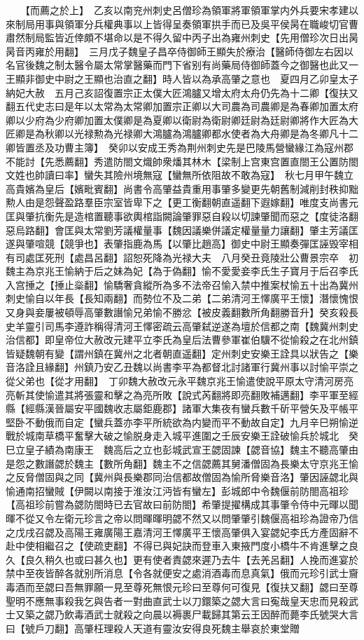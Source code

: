 　　【而薦之於上】　乙亥以南兖州刺史呂僧珍為領軍將軍領軍掌内外兵要宋孝建以來制局用事與領軍分兵權典事以上皆得呈奏領軍拱手而已及吳平侯昺在職峻切官曹肅然制局監皆近倖頗不堪命以是不得久留中丙子出為雍州刺史【先用僧珍次日出昺昺音丙雍於用翻】　三月戊子魏皇子昌卒侍御師王顯失於療治【醫師侍御左右因以名官後魏之制太醫令屬太常掌醫藥而門下省别有尚藥局侍御師蓋今之御醫也此又一王顯非御史中尉之王顯也治直之翻】時人皆以為承高肇之意也　夏四月乙卯皇太子納妃大赦　五月己亥詔復置宗正太僕大匠鴻臚又增太府太舟仍先為十二卿【復扶又翻五代史志曰是年以太常為太常卿加置宗正卿以大司農為司農卿是為春卿加置太府卿以少府為少府卿加置太僕卿是為夏卿以衛尉為衛尉卿廷尉為廷尉卿將作大匠為大匠卿是為秋卿以光禄勲為光禄卿大鴻臚為鴻臚卿都水使者為大舟卿是為冬卿凡十二卿皆置丞及功曹主簿】　癸卯以安成王秀為荆州刺史先是巴陵馬營蠻緣江為寇州郡不能討【先悉薦翻】秀遣防閤文熾帥衆燔其林木【梁制上宫東宫置直閤王公置防閤文姓也帥讀曰率】蠻失其險州境無寇【蠻無所依阻故不敢為寇】　秋七月甲午魏立高貴嬪為皇后【嬪毗賓翻】尚書令高肇益貴重用事肇多變更先朝舊制減削封秩抑黜勲人由是怨聲盈路羣臣宗室皆卑下之【更工衡翻朝直遥翻下遐嫁翻】唯度支尚書元匡與肇抗衡先是造棺置聽事欲輿棺詣闕論肇罪惡自殺以切諫肇聞而惡之【度徒洛翻惡烏路翻】會匡與太常劉芳議權量事【魏因議樂併議定權量量力讓翻】肇主芳議匡遂與肇喧競【競爭也】表肇指鹿為馬【以肇比趙高】御史中尉王顯奏彈匡誣毁宰相有司處匡死刑【處昌呂翻】詔恕死降為光禄大夫　八月癸丑竟陵壯公曹景宗卒　初魏主為京兆王愉納于后之妹為妃【為于偽翻】愉不愛愛妾李氏生子寶月于后召李氏入宫捶之【捶止橤翻】愉驕奢貪縱所為多不法帝召愉入禁中推案杖愉五十出為冀州刺史愉自以年長【長知兩翻】而勢位不及二弟【二弟清河王懌廣平王懷】潛懷愧恨又身與妾屢被頓辱高肇數譖愉兄弟愉不勝忿【被皮義翻數所角翻勝音升】癸亥殺長史羊靈引司馬李遵詐稱得清河王懌密疏云高肇弑逆遂為壇於信都之南【魏冀州刺史治信都】即皇帝位大赦改元建平立李氏為皇后法曹參軍崔伯驥不從愉殺之在北州鎮皆疑魏朝有變【謂州鎮在冀州之北者朝直遥翻】定州刺史安樂王詮具以狀告之【樂音洛詮且緣翻】州鎮乃安乙丑魏以尚書李平為都督北討諸軍行冀州事以討愉平崇之從父弟也【從才用翻】　丁卯魏大赦改元永平魏京兆王愉遣使說平原太守清河房亮亮斬其使愉遣其將張靈和擊之為亮所敗【說式芮翻將即亮翻敗補邁翻】李平軍至經縣【經縣漢晉屬安平國魏收志屬鉅鹿郡】諸軍大集夜有蠻兵數千斫平營矢及平帳平堅卧不動俄而自定【蠻兵蓋亦李平所統欲為内變而平不動故自定】九月辛巳朔愉逆戰於城南草橋平奮擊大破之愉脱身走入城平進圍之壬辰安樂王詮破愉兵於城北　癸巳立皇子績為南康王　魏高后之立也彭城武宣王勰固諫【勰音協】魏主不聽高肇由是怨之數譖勰於魏主【數所角翻】魏主不之信勰薦其舅潘僧固為長樂太守京兆王愉之反脅僧固與之同【冀州與長樂郡同治信都故僧固為愉所脅樂音洛】肇因誣勰北與愉通南招蠻賊【伊闕以南接于淮汝江沔皆有蠻左】彭城郎中令魏偃前防閤高祖珍【高祖珍前嘗為勰防閤時已去官故曰前防閤】希肇提擢構成其事肇令侍中元暉以聞暉不從又令左衛元珍言之帝以問暉暉明勰不然又以問肇肇引魏偃高祖珍為證帝乃信之戊戌召勰及高陽王雍廣陽王嘉清河王懌廣平王懷高肇俱入宴勰妃李氏方產固辭不赴中使相繼召之【使疏吏翻】不得已與妃訣而登車入東掖門度小橋牛不肯進擊之良久【良久稍久也或曰甚久也】更有使者責勰來遲乃去牛【去羌呂翻】人挽而進宴於禁中至夜皆醉各就别所消息【令各就便安之處消酒毒而息真氣】俄而元珍引武士齎毒酒而至勰曰吾無罪願一見至尊死無恨元珍曰至尊何可復見【復扶又翻】勰曰至尊聖明不應無事殺我乞與告者一對曲直武士以刀鐶築之勰大言曰寃哉皇天忠而見殺武士又築之勰乃飲毒酒武士就殺之向晨以褥裹尸載歸其第云王因醉而薨李氏號哭大言曰【號戶刀翻】高肇枉理殺人天道有靈汝安得良死魏主舉哀於東堂贈